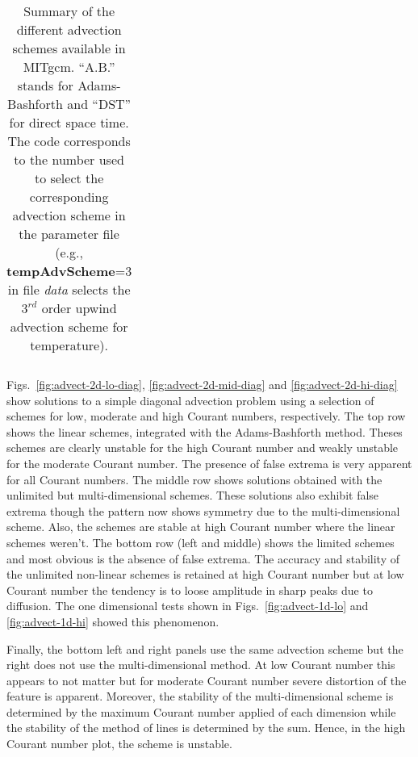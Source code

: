 \begin{table}[htb]
{\begin{tabular}[htb]{|l|c|c|c|c|l|}
 \end{tabular}
 }
 \caption{Summary of the different advection schemes available in MITgcm.
          ``A.B.'' stands for Adams-Bashforth and ``DST'' for direct space time.
          The code corresponds to the number used to select the corresponding
          advection scheme in the parameter file (e.g., {\bf tempAdvScheme}=3 in
          file {\em data} selects the $3^{rd}$ order upwind advection scheme 
          for temperature).
   }
 \label{tab:advectionShemes_summary}
\end{table}


Figs.~\ref{fig:advect-2d-lo-diag}, \ref{fig:advect-2d-mid-diag} and
\ref{fig:advect-2d-hi-diag} show solutions to a simple diagonal
advection problem using a selection of schemes for low, moderate and
high Courant numbers, respectively. The top row shows the linear
schemes, integrated with the Adams-Bashforth method. Theses schemes
are clearly unstable for the high Courant number and weakly unstable
for the moderate Courant number. The presence of false extrema is very
apparent for all Courant numbers. The middle row shows solutions
obtained with the unlimited but multi-dimensional schemes. These
solutions also exhibit false extrema though the pattern now shows
symmetry due to the multi-dimensional scheme. Also, the schemes are
stable at high Courant number where the linear schemes weren't. The
bottom row (left and middle) shows the limited schemes and most
obvious is the absence of false extrema. The accuracy and stability of
the unlimited non-linear schemes is retained at high Courant number
but at low Courant number the tendency is to loose amplitude in sharp
peaks due to diffusion. The one dimensional tests shown in
Figs.~\ref{fig:advect-1d-lo} and \ref{fig:advect-1d-hi} showed this
phenomenon.

Finally, the bottom left and right panels use the same advection
scheme but the right does not use the multi-dimensional method. At low
Courant number this appears to not matter but for moderate Courant
number severe distortion of the feature is apparent. Moreover, the
stability of the multi-dimensional scheme is determined by the maximum
Courant number applied of each dimension while the stability of the
method of lines is determined by the sum. Hence, in the high Courant
number plot, the scheme is unstable.

